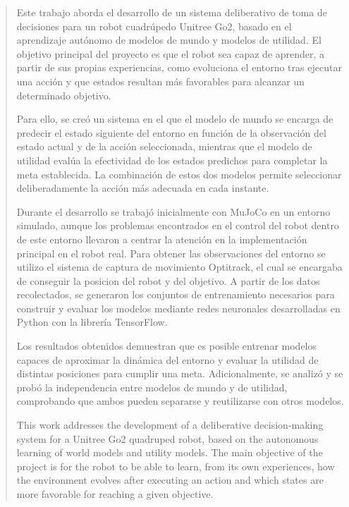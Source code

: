 
\pagestyle{empty}
\begin{abstract}
  Este trabajo aborda el desarrollo de un sistema deliberativo de toma de decisiones para un robot cuadrúpedo Unitree Go2, basado en el aprendizaje autónomo de modelos de mundo y modelos de 
  utilidad. El objetivo principal del proyecto es que el robot sea capaz de aprender, a partir de sus propias experiencias, como evoluciona el entorno tras ejecutar una acción y que estados 
  resultan más favorables para alcanzar un determinado objetivo.

  Para ello, se creó un sistema en el que el modelo de mundo se encarga de predecir el estado siguiente del entorno en función de la observación del estado actual y de la acción seleccionada, 
  mientras que el modelo de utilidad evalúa la efectividad de los estados predichos para completar la meta establecida. La combinación de estos dos modelos permite seleccionar deliberadamente 
  la acción más adecuada en cada instante.

  Durante el desarrollo se trabajó inicialmente con MuJoCo en un entorno simulado, aunque los problemas encontrados en el control del robot dentro de este entorno llevaron a centrar la atención 
  en la implementación principal en el robot real. Para obtener las observaciones del entorno se utilizo el sistema de captura de movimiento Optitrack, el cual se encargaba de conseguir la 
  posicion del robot y del objetivo. A partir de los datos recolectados, se generaron los conjuntos de entrenamiento necesarios para construir y evaluar los modelos mediante redes neuronales 
  desarrolladas en Python con la librería TensorFlow.

  Los resultados obtenidos demuestran que es posible entrenar modelos capaces de aproximar la dinámica del entorno y evaluar la utilidad de distintas posiciones para cumplir una 
  meta. Adicionalmente, se analizó y se probó la independencia entre modelos de mundo y de utilidad, comprobando que ambos pueden separarse y reutilizarse con otros modelos.

  \vspace*{25pt}
  \begin{segundoresumo}
    This work addresses the development of a deliberative decision-making system for a Unitree Go2 quadruped robot, based on the autonomous learning of world models and utility models. The main 
    objective of the project is for the robot to be able to learn, from its own experiences, how the environment evolves after executing an action and which states are more favorable for reaching 
    a given objective.


\end{segundoresumo}
\end{abstract}
